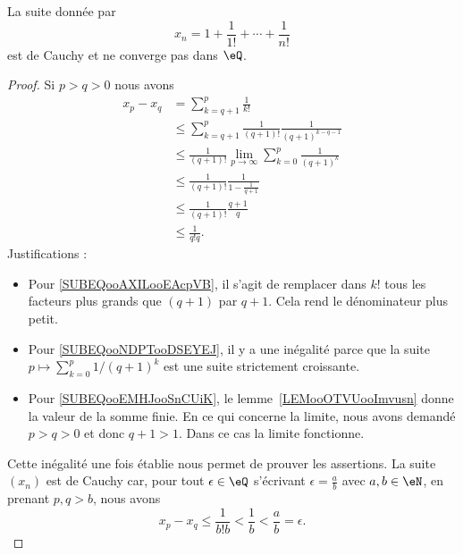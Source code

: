 \begin{proposition}
	La suite donnée par
	\begin{equation}
		x_n=1+\frac{ 1 }{ 1! }+\cdots +\frac{1}{ n! }
	\end{equation}
	est de Cauchy et ne converge pas dans \( \eQ\).
\end{proposition}

\begin{proof}
	Si \( p>q>0\) nous avons
	\begin{subequations}
		\begin{align}
			x_p-x_q & =\sum_{k=q+1}^p\frac{1}{ k! }                                                                            \\
			        & \leq \sum_{k=q+1}^p\frac{1}{ (q+1)! }\frac{1}{ (q+1)^{k-q-1} }  \label{SUBEQooAXILooEAcpVB}              \\
			        & \leq \frac{1}{ (q+1)! }\lim_{p\to \infty} \sum_{k=0}^{p}\frac{1}{ (q+1)^k }  \label{SUBEQooNDPTooDSEYEJ} \\
			        & \leq \frac{1}{ (q+1)! }\frac{1}{ 1-\frac{1}{ q+1 } } \label{SUBEQooEMHJooSnCUiK}                         \\
			        & \leq \frac{1}{ (q+1)! }\frac{q+1}{q}                                                                     \\
			        & \leq \frac{1}{ q!q }.
		\end{align}
	\end{subequations}
	Justifications :
	\begin{itemize}
		\item Pour \eqref{SUBEQooAXILooEAcpVB}, il s'agit de remplacer dans \( k!\) tous les facteurs plus grands que \( (q+1)\) par \( q+1\). Cela rend le dénominateur plus petit.
		\item Pour \eqref{SUBEQooNDPTooDSEYEJ}, il y a une inégalité parce que la suite \( p\mapsto \sum_{k=0}^p1/(q+1)^k\) est une suite strictement croissante.

		\item Pour \eqref{SUBEQooEMHJooSnCUiK}, le lemme~\ref{LEMooOTVUooImvusn} donne la valeur de la somme finie. En ce qui concerne la limite, nous avons demandé \( p>q>0\) et donc \( q+1>1\). Dans ce cas la limite fonctionne.
	\end{itemize}

	Cette inégalité une fois établie nous permet de prouver les assertions. La suite \( (x_n) \) est de Cauchy car, pour tout \( \epsilon\in\eQ\) s'écrivant \( \epsilon=\frac{ a }{ b }\) avec \( a,b\in \eN\), en prenant \( p,q>b\), nous avons
	\begin{equation}
		x_p-x_q\leq \frac{1}{ b!b }<\frac{1}{ b }<\frac{ a }{ b }=\epsilon.
	\end{equation}


\end{proof}
